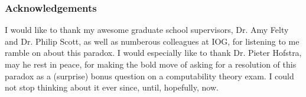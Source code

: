 \documentclass[runningheads]{llncs}
\begin{document}
%
%


\subsubsection*{Acknowledgements}

I would like to thank my awesome graduate school supervisors, Dr. Amy Felty
and Dr. Philip Scott, as well as numberous colleagues at IOG,
for listening to me ramble on about this paradox.
I would especially like to thank Dr. Pieter Hofstra, may he rest in peace,
for making the bold move of asking for a resolution
of this paradox as a (surprise) bonus question on a computability theory exam.
I could not stop thinking about it ever since, until, hopefully, now.


%



\end{document}
